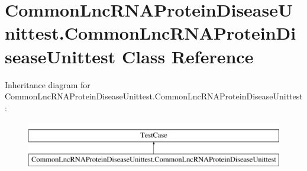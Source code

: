 \hypertarget{classCommonLncRNAProteinDiseaseUnittest_1_1CommonLncRNAProteinDiseaseUnittest}{\section{Common\-Lnc\-R\-N\-A\-Protein\-Disease\-Unittest.\-Common\-Lnc\-R\-N\-A\-Protein\-Disease\-Unittest Class Reference}
\label{classCommonLncRNAProteinDiseaseUnittest_1_1CommonLncRNAProteinDiseaseUnittest}
}
Inheritance diagram for Common\-Lnc\-R\-N\-A\-Protein\-Disease\-Unittest.\-Common\-Lnc\-R\-N\-A\-Protein\-Disease\-Unittest\-:\begin{figure}[H]
\begin{center}
\leavevmode
\includegraphics[height=2.000000cm]{classCommonLncRNAProteinDiseaseUnittest_1_1CommonLncRNAProteinDiseaseUnittest}
\end{center}
\end{figure}
